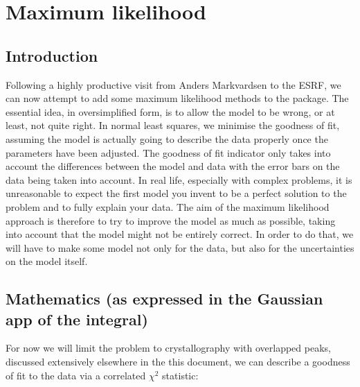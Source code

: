 \documentclass[10pt,a4paper,twoside,notitlepage]{report}
\begin{document}

\pagestyle{fancy}
\renewcommand{\chaptermark}[1]{
      \markboth{\chaptername
      \ \thechapter.\ #1} {} }

\renewcommand{\sectionmark}[1]{
      \markright {   
      \ \thesection.\ #1} {} }

\fancyhead[LE,RO]{\rightmark}
\fancyhead[LO,RE]{\leftmark}
\fancyfoot[C]{\today}
\fancyfoot[LE,RO]{\thepage}
\renewcommand{\footrulewidth}{0.4pt}



\chapter{Maximum likelihood}

\section{Introduction}
Following a highly productive visit from Anders Markvardsen to the ESRF,
we can now attempt to add some maximum likelihood methods to the 
package. 
The essential idea, in oversimplified form, is to allow the model to 
be wrong, or at least, not quite right.
In normal least squares, we minimise the goodness of fit, assuming the 
model is actually going to describe the data properly once the 
parameters have been adjusted. 
The goodness of fit indicator only takes into account the differences
between the model and data with the error bars on the data being taken
into account.
In real life, especially with complex problems, it is unreasonable to 
expect the first model you invent to be a perfect solution to the problem
and to fully explain your data. 
The aim of the maximum likelihood approach is therefore to try to improve
the model as much as possible, taking into account that the model might not
be entirely correct.
In order to do that, we will have to make some model not only for the data, but
also for the uncertainties on the model itself. 


\section{Mathematics (as expressed in the Gaussian app of the
  integral)}

For now we will limit the problem to crystallography with overlapped peaks, 
discussed extensively elsewhere in the this document, we can describe
a goodness of fit to the data via a correlated $\chi^2$ statistic:
\end{document}
